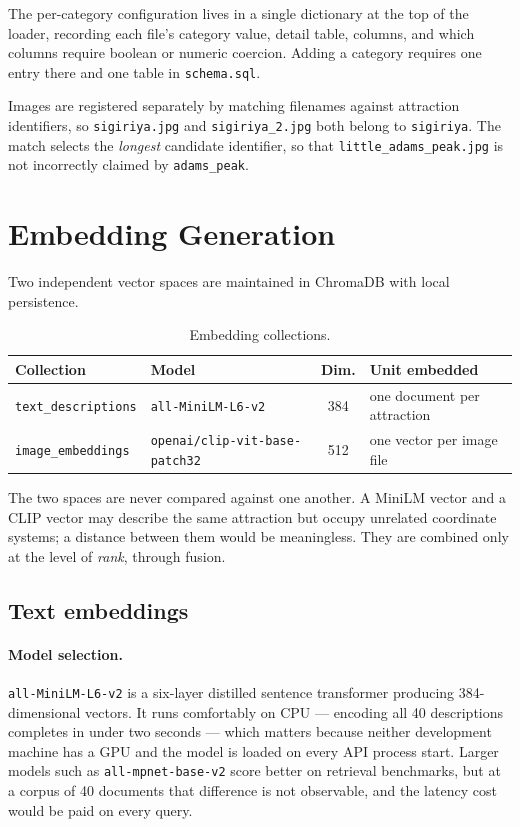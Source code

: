\documentclass[11pt,a4paper]{article}
\begin{document}
The per-category configuration lives in a single dictionary at the top of the
loader, recording each file's category value, detail table, columns, and which
columns require boolean or numeric coercion. Adding a category requires one
entry there and one table in \texttt{schema.sql}.

Images are registered separately by matching filenames against attraction
identifiers, so \texttt{sigiriya.jpg} and \texttt{sigiriya\_2.jpg} both belong
to \texttt{sigiriya}. The match selects the \emph{longest} candidate identifier,
so that \texttt{little\_adams\_peak.jpg} is not incorrectly claimed by
\texttt{adams\_peak}.

\section{Embedding Generation}

Two independent vector spaces are maintained in ChromaDB with local persistence.

\begin{table}[h]
\centering
\small
\begin{tabular}{llcl}
\toprule
\textbf{Collection} & \textbf{Model} & \textbf{Dim.} & \textbf{Unit embedded} \\
\midrule
\texttt{text\_descriptions} & \texttt{all-MiniLM-L6-v2} & 384 & one document per attraction \\
\texttt{image\_embeddings}  & \texttt{openai/clip-vit-base-patch32} & 512 & one vector per image file \\
\bottomrule
\end{tabular}
\caption{Embedding collections.}
\end{table}

The two spaces are never compared against one another. A MiniLM vector and a
CLIP vector may describe the same attraction but occupy unrelated coordinate
systems; a distance between them would be meaningless. They are combined only at
the level of \emph{rank}, through fusion.

\subsection{Text embeddings}

\paragraph{Model selection.} \texttt{all-MiniLM-L6-v2} is a six-layer distilled
sentence transformer producing 384-dimensional vectors. It runs comfortably on
CPU --- encoding all 40 descriptions completes in under two seconds --- which
matters because neither development machine has a GPU and the model is loaded on
every API process start. Larger models such as \texttt{all-mpnet-base-v2} score
better on retrieval benchmarks, but at a corpus of 40 documents that difference
is not observable, and the latency cost would be paid on every query.
\end{document}
